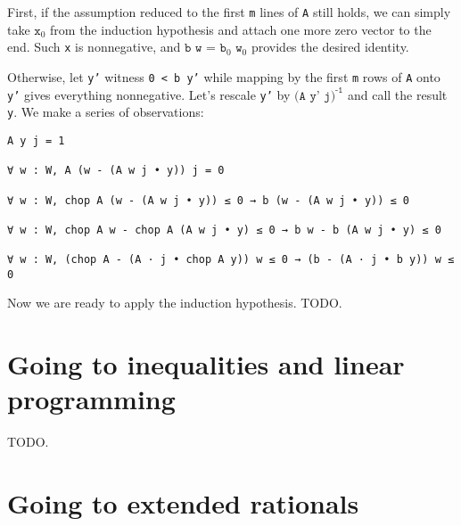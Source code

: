 \documentclass[]{article}
\begin{document}
First, if the assumption reduced to the first \texttt{m} lines of \texttt{A} still holds,
we can simply take $\texttt{x}_0$ from the induction hypothesis and attach one more zero vector
to the end. Such \texttt{x} is nonnegative, and $\texttt{b w = b}_0\texttt{ w}_0$ provides
the desired identity.

Otherwise, let \texttt{y'} witness \texttt{0 < b y'} while mapping by the first \texttt{m} rows
of \texttt{A} onto \texttt{y'} gives everything nonnegative.
Let's rescale \texttt{y'} by $\texttt{(A y' j)}^{\texttt{-1}}$ and call the result \texttt{y}.
We make a series of observations:
\begin{lstlisting}
A y j = 1

∀ w : W, A (w - (A w j • y)) j = 0

∀ w : W, chop A (w - (A w j • y)) ≤ 0 → b (w - (A w j • y)) ≤ 0

∀ w : W, chop A w - chop A (A w j • y) ≤ 0 → b w - b (A w j • y) ≤ 0

∀ w : W, (chop A - (A · j • chop A y)) w ≤ 0 → (b - (A · j • b y)) w ≤ 0
\end{lstlisting}
Now we are ready to apply the induction hypothesis.
TODO.


\section {Going to inequalities and linear programming}

TODO.


\section {Going to extended rationals}
\renewcommand{\arraystretch}{1.25}
\end{document}
